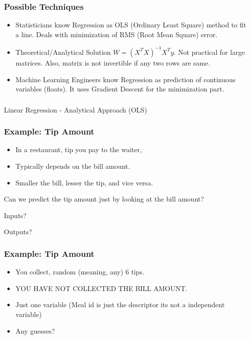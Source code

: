 \begin{frame}[fragile]\frametitle{Possible Techniques}
\begin{itemize}
\item Statisticians know Regression as OLS (Ordinary Least Square) method to fit a line.  Deals with minimization of RMS (Root Mean Square) error.
\item Theoretical/Analytical Solution $W = (X^TX)^{-1} X^T y$. Not practical for large matrices. Also, matrix is not invertible if any two rows are same.
\item Machine Learning Engineers know Regression as prediction of continuous variables (floats). It uses Gradient Descent for the minimization part.
\end{itemize}
\end{frame}

\begin{frame}[fragile]\frametitle{}
\begin{center}
{\Large Linear Regression - Analytical Approach (OLS)}
\end{center}
\end{frame}



\begin{frame}[fragile]\frametitle{Example: Tip Amount}
\begin{itemize}
\item In a restaurant, tip you pay to the waiter, 
\item Typically depends on the bill amount.
\item Smaller the bill, lesser the tip, and vice versa.
\end{itemize}

Can we predict the tip amount just by looking at the bill amount?

Inputs?

Outputs?
\end{frame}

\begin{frame}[fragile]\frametitle{Example: Tip Amount}
\begin{itemize}
\item You collect, random (meaning, any) 6 tips.
\item YOU HAVE NOT COLLECTED THE BILL AMOUNT.
\item Just one variable (Meal id is just the descriptor its not a independent variable)
\item Any guesses?
\end{itemize}
\end{frame}

